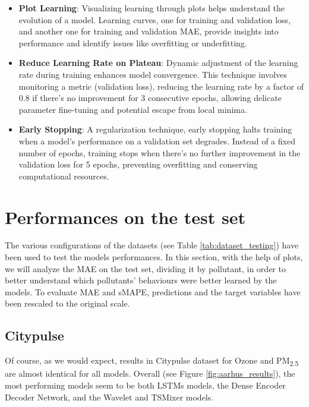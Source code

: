 \begin{itemize}
    \item \textbf{Plot Learning}: Visualizing learning through plots helps understand the evolution of a model. Learning curves, one for training and validation loss, and another one for training and validation MAE, provide insights into performance and identify issues like overfitting or underfitting.

    \item \textbf{Reduce Learning Rate on Plateau}: Dynamic adjustment of the learning rate during training enhances model convergence. This technique involves monitoring a metric (validation loss), reducing the learning rate by a factor of 0.8 if there's no improvement for 3 consecutive epochs, allowing delicate parameter fine-tuning and potential escape from local minima.

    \item \textbf{Early Stopping}: A regularization technique, early stopping halts training when a model's performance on a validation set degrades. Instead of a fixed number of epochs, training stops when there's no further improvement in the validation loss for 5 epochs, preventing overfitting and conserving computational resources.
\end{itemize}

\section{Performances on the test set}
The various configurations of the datasets (see Table \ref{tab:dataset_testing}) have been used to test the models performances.
In this section, with the help of plots, we will analyze the MAE on the test set, dividing it by pollutant, in order to better understand which pollutants' behaviours were better learned  by the models. To evaluate MAE and sMAPE, predictions and the target variables have been rescaled to the original scale.

\subsection{Citypulse}

Of course, as we would expect, results in Citypulse dataset for Ozone and PM\textsubscript{2.5} are almost identical for all models.
Overall (see Figure \ref{fig:aarhus_results}), the most performing models seem to be both LSTMs models, the Dense Encoder Decoder Network, and the Wavelet and TSMixer models. 


